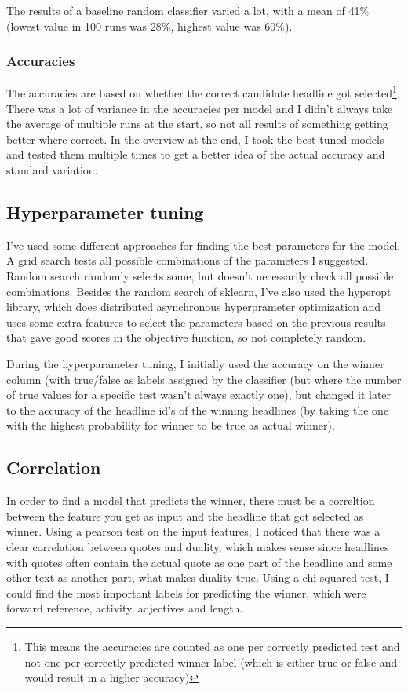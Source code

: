 \documentclass{article}
\begin{document}
 The results of a baseline random classifier varied a lot, with a mean of 41\% (lowest value in 100 runs was 28\%, highest value was 60\%).

 \subsubsection{Accuracies}
 The accuracies are based on whether the correct candidate headline got selected\footnote{This means the accuracies are counted as one per correctly predicted test and not one per correctly predicted winner label (which is either true or false and would result in a higher accuracy)}. There was a lot of variance in the accuracies per model and I didn't always take the average of multiple runs at the start, so not all results of something getting better where correct. In the overview at the end, I took the best tuned models and tested them multiple times to get a better idea of the actual accuracy and standard variation.

 \subsection{Hyperparameter tuning}
 I've used some different approaches for finding the best parameters for the model. A grid search tests all possible combinations of the parameters I suggested. Random search randomly selects some, but doesn't necessarily check all possible combinations. Besides the random search of sklearn, I've also used the hyperopt library, which does distributed asynchronous hyperprameter optimization and uses some extra features to select the parameters based on the previous results that gave good scores in the objective function, so not completely random.

 During the hyperparameter tuning, I initially used the accuracy on the winner column (with true/false as labels assigned by the classifier (but where the number of true values for a specific test wasn't always exactly one), but changed it later to the accuracy of the headline id's of the winning headlines (by taking the one with the highest probability for winner to be true as actual winner).

 \subsection{Correlation}
 In order to find a model that predicts the winner, there must be a correltion between the feature you get as input and the headline that got selected as winner. Using a pearson test on the input features, I noticed that there was a clear correlation between quotes and duality, which makes sense since headlines with quotes often contain the actual quote as one part of the headline and some other text as another part, what makes duality true. Using a chi squared test, I could find the most important labels for predicting the winner, which were forward reference, activity, adjectives and length.
\end{document}
